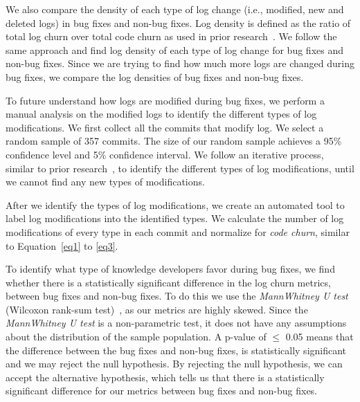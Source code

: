 We also compare the density of each type of log change (i.e., modified, new and deleted logs) in bug fixes and non-bug fixes. Log density is defined as the ratio of total log churn over total code churn as used in prior research~\cite{Characterizinglogs}. We follow the same approach and find log density of each type of log change for bug fixes and non-bug fixes. Since we are trying to find how much more logs are changed during bug fixes, we compare the log densities of bug fixes and non-bug fixes. 


To future understand how logs are modified during bug fixes, we perform a manual analysis on the modified logs to identify the different types of log modifications. We first collect all the commits that modify log. We select a random sample of 357 commits. The size of our random sample achieves a 95\% confidence level and 5\% confidence interval. We follow an iterative process, similar to prior research~\cite{seaman1999qualitative}, to identify the different types of log modifications, until we cannot find any new types of modifications. 

After we identify the types of log modifications, we create an automated tool to label log modifications into the identified types. We calculate the number of log modifications of every type in each commit and normalize for {\em code churn}, similar to Equation~\ref{eq1} to \ref{eq3}.

To identify what type of knowledge developers favor during bug fixes, we find whether there is a statistically significant difference in the log churn metrics, between bug fixes and non-bug fixes. To do this we use the \textsl{MannWhitney U test} (Wilcoxon rank-sum test)~\cite{Gehan1965}, as our metrics are highly skewed. Since the {\em MannWhitney U test} is a non-parametric test, it does not have any assumptions about the distribution of the sample population. A p-value of \ensuremath{\le} 0.05 means that the difference between the bug fixes and non-bug fixes, is statistically significant and we may reject the null hypothesis. By rejecting the null hypothesis, we can accept the alternative hypothesis, which tells us that there is a statistically significant difference for our metrics between bug fixes and non-bug fixes.


